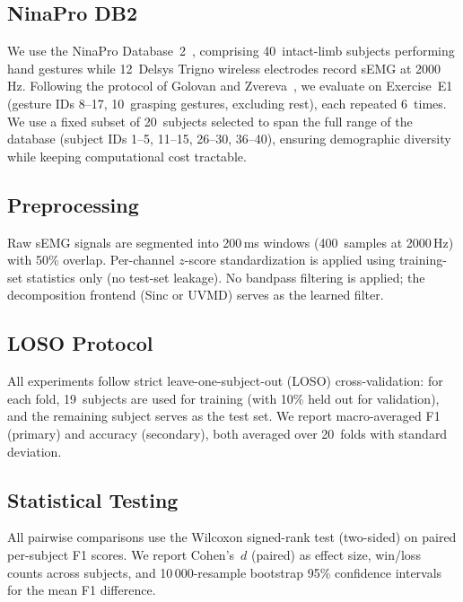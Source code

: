 \documentclass[conference]{IEEEtran}
\newcommand{\uvmd}{\textsc{UVMD}}
\begin{document}
\subsection{NinaPro DB2}
We use the NinaPro Database~2~\cite{atzori2014electromyography}, comprising 40~intact-limb subjects performing hand gestures while 12~Delsys Trigno wireless electrodes record sEMG at 2000\,Hz.
Following the protocol of Golovan and Zvereva~\cite{golovan2025benchmark}, we evaluate on Exercise~E1 (gesture IDs 8--17, 10~grasping gestures, excluding rest), each repeated 6~times.
We use a fixed subset of 20~subjects selected to span the full range of the database (subject IDs 1--5, 11--15, 26--30, 36--40), ensuring demographic diversity while keeping computational cost tractable.

\subsection{Preprocessing}
Raw sEMG signals are segmented into 200\,ms windows (400~samples at 2000\,Hz) with 50\% overlap.
Per-channel $z$-score standardization is applied using training-set statistics only (no test-set leakage).
No bandpass filtering is applied; the decomposition frontend (Sinc or \uvmd{}) serves as the learned filter.

\subsection{LOSO Protocol}
All experiments follow strict leave-one-subject-out (LOSO) cross-validation: for each fold, 19~subjects are used for training (with 10\% held out for validation), and the remaining subject serves as the test set.
We report macro-averaged F1 (primary) and accuracy (secondary), both averaged over 20~folds with standard deviation.

\subsection{Statistical Testing}
\label{sec:stats}
All pairwise comparisons use the Wilcoxon signed-rank test (two-sided) on paired per-subject F1 scores.
We report Cohen's~$d$ (paired) as effect size, win/loss counts across subjects, and 10\,000-resample bootstrap 95\% confidence intervals for the mean F1 difference.
\end{document}
